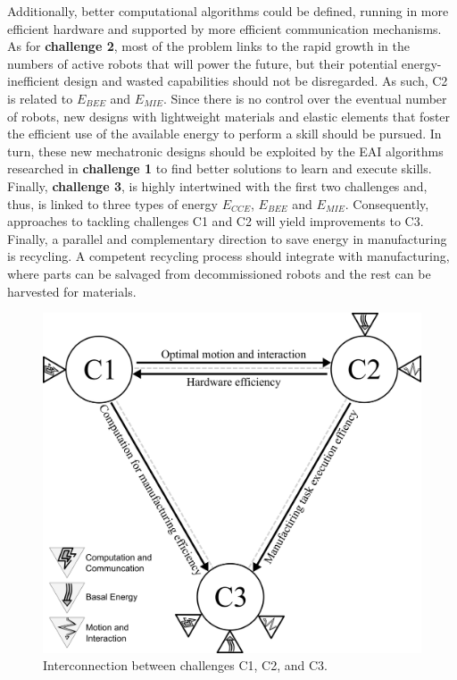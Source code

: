 Additionally, better computational algorithms could be defined, running in more efficient hardware and supported by more efficient communication mechanisms. As for \textbf{challenge 2}, most of the problem links to the rapid growth in the numbers of active robots that will power the future, but their potential energy-inefficient design and wasted capabilities should not be disregarded. As such, C2 is related to $E_{BEE}$ and $E_{MIE}$. Since there is no control over the eventual number of robots, new designs with lightweight materials and elastic elements that foster the efficient use of the available energy to perform a skill should be pursued. In turn, these new mechatronic designs should be exploited by the EAI algorithms researched in \textbf{challenge 1} to find better solutions to learn and execute skills. Finally, \textbf{challenge 3}, is highly intertwined with the first two challenges and, thus, is linked to three types of energy $E_{CCE}$, $E_{BEE}$ and $E_{MIE}$. Consequently, approaches to tackling challenges C1 and C2 will yield improvements to C3. Finally, a parallel and complementary direction to save energy in manufacturing is recycling. A competent recycling process should integrate with manufacturing, where parts can be salvaged from decommissioned robots and the rest can be harvested for materials.
\begin{figure}[!t]
	\centering
	\includegraphics[width=0.8\columnwidth]{fig/grand_challenges_connections.png}
	\caption{Interconnection between challenges C1, C2, and C3.}
	\label{fig:challengesConnected}
\end{figure}
